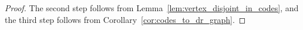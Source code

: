 \documentclass[11pt]{article}
\newcommand{\dist}{\mathrm{dist}}
\begin{document}
\begin{proof}
The second step follows from Lemma~\ref{lem:vertex_disjoint_in_codes}, and the third step follows from Corollary~\ref{cor:codes_to_dr_graph}.

\end{proof}
\end{document}
